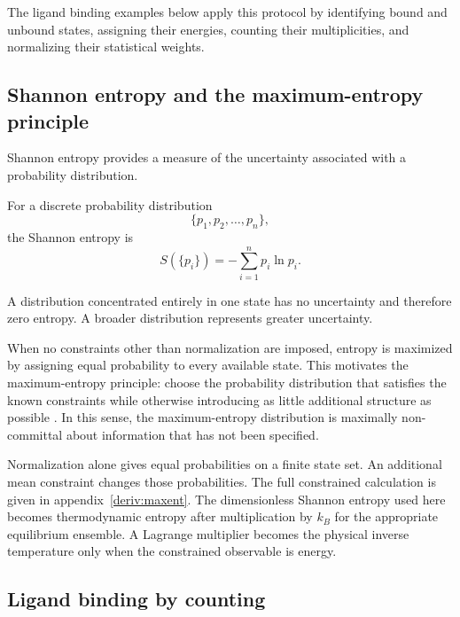 The ligand binding examples below apply this protocol by identifying bound and unbound states, assigning their energies, counting their multiplicities, and normalizing their statistical weights.
\subsection{Shannon entropy and the maximum-entropy principle}
\label{sec:entropy}



Shannon entropy provides a measure of the uncertainty associated with a probability distribution.

For a discrete probability distribution
\[
    \{p_1,p_2,\ldots,p_n\},
\]
the Shannon entropy is
\[
    \boxed{S(\{p_i\})=-\sum_{i=1}^{n}p_i\ln p_i.}
\]

A distribution concentrated entirely in one state has no uncertainty and therefore zero entropy.
A broader distribution represents greater uncertainty.

When no constraints other than normalization are imposed, entropy is maximized by assigning equal probability to every available state.
This motivates the maximum-entropy principle: choose the probability distribution that satisfies the known constraints while otherwise introducing as little additional structure as possible \cite{jaynes1957information}.
In this sense, the maximum-entropy distribution is maximally non-committal about information that has not been specified.



Normalization alone gives equal probabilities on a finite state set.
An additional mean constraint changes those probabilities.
The full constrained calculation is given in appendix~\ref{deriv:maxent}.
The dimensionless Shannon entropy used here becomes thermodynamic entropy after multiplication by $k_B$ for the appropriate equilibrium ensemble.
A Lagrange multiplier becomes the physical inverse temperature only when the constrained observable is energy.
\subsection{Ligand binding by counting}
\label{sec:binding-counting}




